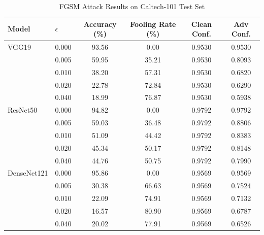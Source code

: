 \begin{table}[h]
\centering
\caption{FGSM Attack Results on Caltech-101 Test Set}
\label{tab:fgsm_results}
\begin{tabular}{llcccc}
\toprule
Model & $\epsilon$ & Accuracy (\%) & Fooling Rate (\%) & Clean Conf. & Adv Conf. \\
\midrule
VGG19 & 0.000 & 93.56 & 0.00 & 0.9530 & 0.9530 \\
 & 0.005 & 59.95 & 35.21 & 0.9530 & 0.8093 \\
 & 0.010 & 38.20 & 57.31 & 0.9530 & 0.6820 \\
 & 0.020 & 22.78 & 72.84 & 0.9530 & 0.6290 \\
 & 0.040 & 18.99 & 76.87 & 0.9530 & 0.5938 \\
\midrule
ResNet50 & 0.000 & 94.82 & 0.00 & 0.9792 & 0.9792 \\
 & 0.005 & 59.03 & 36.48 & 0.9792 & 0.8806 \\
 & 0.010 & 51.09 & 44.42 & 0.9792 & 0.8383 \\
 & 0.020 & 45.34 & 50.17 & 0.9792 & 0.8148 \\
 & 0.040 & 44.76 & 50.75 & 0.9792 & 0.7990 \\
\midrule
DenseNet121 & 0.000 & 95.86 & 0.00 & 0.9569 & 0.9569 \\
 & 0.005 & 30.38 & 66.63 & 0.9569 & 0.7524 \\
 & 0.010 & 22.09 & 74.91 & 0.9569 & 0.7132 \\
 & 0.020 & 16.57 & 80.90 & 0.9569 & 0.6787 \\
 & 0.040 & 20.02 & 77.91 & 0.9569 & 0.6526 \\
\bottomrule
\end{tabular}
\end{table}

